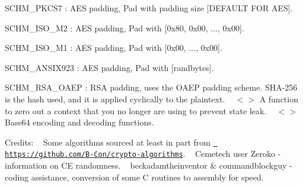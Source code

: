 \begin{DoxyItemize}
\item SCHM\+\_\+\+PKCS7 \+: AES padding, Pad with padding size \mbox{[}DEFAULT FOR AES\mbox{]}. ~\newline

\item SCHM\+\_\+\+ISO\+\_\+\+M2 \+: AES padding, Pad with \mbox{[}0x80, 0x00, ..., 0x00\mbox{]}. ~\newline

\item SCHM\+\_\+\+ISO\+\_\+\+M1 \+: AES padding, Pad with \mbox{[}0x00, ..., 0x00\mbox{]}. ~\newline

\item SCHM\+\_\+\+ANSIX923 \+: AES padding, Pad with \mbox{[}randbytes\mbox{]}. ~\newline

\item SCHM\+\_\+\+RSA\+\_\+\+OAEP \+: RSA padding, uses the OAEP padding scheme. SHA-\/256 is the hash used, and it is applied cyclically to the plaintext. ~\newline
 $<$$>$ A function to zero out a context that you no longer are using to prevent state leak. ~\newline
 $<$$>$ Base64 encoding and decoding functions. ~\newline

\end{DoxyItemize}

Credits\+: ~\newline
 Some algorithms sourced at least in part from \href{https://github.com/B-Con/crypto-algorithms}{\texttt{ https\+://github.\+com/\+B-\/\+Con/crypto-\/algorithms}}. ~\newline
 Cemetech user Zeroko -\/ information on CE randomness. ~\newline
 beckadamtheinventor \& commandblockguy -\/ coding assistance, conversion of some C routines to assembly for speed. ~\newline
 